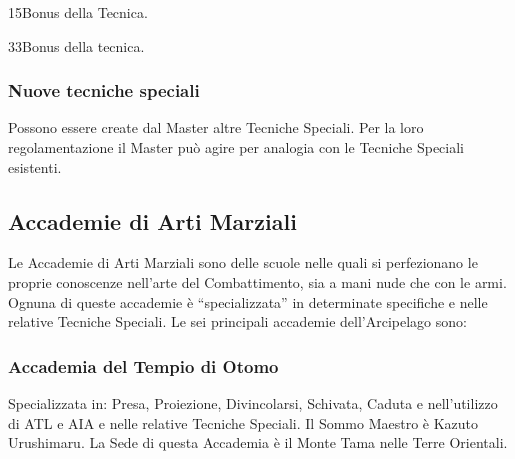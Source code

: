 \begin{description}
  
  {1}{5}{Bonus della Tecnica.}
  
  
    {3}{3}{Bonus della tecnica.}
  

\end{description}

\subsubsection{Nuove tecniche speciali}

Possono essere create dal Master altre Tecniche Speciali.
Per la loro regolamentazione il Master pu\`o agire per
analogia con le Tecniche Speciali esistenti.

\subsection{Accademie di Arti Marziali}
\label{accademiemarziali} 

Le Accademie di Arti Marziali sono delle scuole nelle quali si
perfezionano le proprie conoscenze nell'arte del Combattimento, sia a
mani nude che con le armi.  Ognuna di queste accademie \`e
``specializzata'' in determinate specifiche e nelle relative Tecniche
Speciali.  Le sei principali accademie dell'Arcipelago sono:

\subsubsection{Accademia del Tempio di Otomo}  Specializzata in: Presa,
Proiezione, Divincolarsi, Schivata, Caduta e nell'utilizzo di ATL e
AIA e nelle relative Tecniche Speciali.  Il Sommo Maestro \`e Kazuto
Urushimaru.  La Sede di questa Accademia \`e il Monte Tama nelle
Terre Orientali. 

